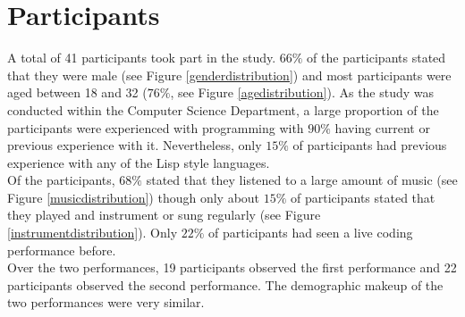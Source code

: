 \documentclass{article}
\begin{document}
\section{Participants}

A total of 41 participants took part in the study. $66\%$ of the participants stated that they were male (see Figure \ref{genderdistribution}) and most participants were aged between 18 and 32 ($76\%$, see Figure \ref{agedistribution}). As the study was conducted within the Computer Science Department, a large proportion of the participants were experienced with programming with $90\%$ having current or previous experience with it. Nevertheless, only $15\%$ of participants had previous experience with any of the Lisp style languages.\\

Of the participants, $68\%$ stated that they listened to a large amount of music (see Figure \ref{musicdistribution}) though only about $15\%$ of participants stated that they played and instrument or sung regularly (see Figure \ref{instrumentdistribution}). Only $22\%$ of participants had seen a live coding performance before.\\

Over the two performances, 19 participants observed the first performance and 22 participants observed the second performance. The demographic makeup of the two performances were very similar.
\end{document}

